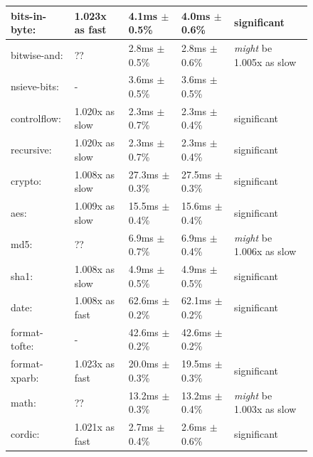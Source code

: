 \documentclass{article}
\begin{document}
\begin{figure}[H]
\begin{tabular}{|l|l|l|l|l|}
\hline\hspace{0.5em} bits-in-byte:      & 1.023x as fast   &   4.1ms $\pm$ 0.5\% &    4.0ms $\pm$ 0.6\%   &  significant \\
\hline\hspace{0.5em} bitwise-and:       & ??               &   2.8ms $\pm$ 0.5\% &    2.8ms $\pm$ 0.6\%   &  \textit{might} be 1.005x as slow \\
\hline\hspace{0.5em} nsieve-bits:       & -                &   3.6ms $\pm$ 0.5\% &    3.6ms $\pm$ 0.5\% & \\
\hline\hline
controlflow:         & 1.020x as slow &   2.3ms $\pm$ 0.7\% &    2.3ms $\pm$ 0.4\%   &  significant \\
\hline\hspace{0.5em} recursive:         & 1.020x as slow &   2.3ms $\pm$ 0.7\% &    2.3ms $\pm$ 0.4\%   &  significant \\
\hline\hline
crypto:              & 1.008x as slow &  27.3ms $\pm$ 0.3\% &   27.5ms $\pm$ 0.3\%   &  significant \\
\hline\hspace{0.5em} aes:               & 1.009x as slow &  15.5ms $\pm$ 0.4\% &   15.6ms $\pm$ 0.4\%   &  significant \\
\hline\hspace{0.5em} md5:               & ??               &   6.9ms $\pm$ 0.7\% &    6.9ms $\pm$ 0.4\%   &  \textit{might} be 1.006x as slow \\
\hline\hspace{0.5em} sha1:              & 1.008x as slow &   4.9ms $\pm$ 0.5\% &    4.9ms $\pm$ 0.5\%   &  significant \\
\hline\hline
date:                & 1.008x as fast   &  62.6ms $\pm$ 0.2\% &   62.1ms $\pm$ 0.2\%   &  significant \\
\hline\hspace{0.5em} format-tofte:      & -                &  42.6ms $\pm$ 0.2\% &   42.6ms $\pm$ 0.2\%   & \\
\hline\hspace{0.5em} format-xparb:      & 1.023x as fast   &  20.0ms $\pm$ 0.3\% &   19.5ms $\pm$ 0.3\%   &  significant \\
\hline\hline
math:                & ??               &  13.2ms $\pm$ 0.3\% &   13.2ms $\pm$ 0.4\%   &  \textit{might} be 1.003x as slow \\
\hline\hspace{0.5em} cordic:            & 1.021x as fast   &   2.7ms $\pm$ 0.4\% &    2.6ms $\pm$ 0.6\%   &  significant \\

\end{tabular}
\end{figure}
\end{document}

